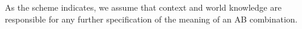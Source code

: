 \documentclass[a4paper,12pt,oneside]{book}
\begin{document}
As the scheme indicates, we assume that context and world knowledge are
responsible for any further specification of the meaning of an AB combination. 
\end{document}
